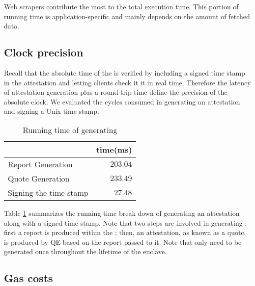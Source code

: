 Web scrapers contribute the most to the
total execution time. This portion of running time
is application-specific and mainly depends on the
amount of fetched data.


\subsection{Clock precision}

Recall that the absolute time of the \encname is verified
by including a signed time stamp in the attestation and letting 
clients check it it in real time. Therefore the latency
of attestation generation plus a round-trip time
define the precision of the absolute clock. 
We evaluated the cycles consumed in generating an attestation and
signing a Unix time stamp.


\begin{table}[ht]
\centering
\begin{tabular}{lr}
\toprule
  & time(ms) \\
\midrule
Report Generation & $203.04$ \\
Quote Generation & $233.49$ \\
Signing the time stamp & $27.48$ \\
\bottomrule
\end{tabular}
\caption{Running time of generating \att}
\label{tab:eval_att}
\end{table}

Table \ref{tab:eval_att} summarizes the running time break down of generating an
attestation along with a signed time stamp.  Note that two steps are involved in
generating \att: first a report is produced within the \encname; then, an
attestation, as known as a quote, is produced by QE based on the report passed
to it. Note that \att only need to be generated once throughout the lifetime of the
enclave.


\subsection{Gas costs}

